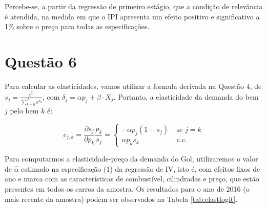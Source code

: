 \documentclass{article}
\begin{document}
Percebe-se, a partir da regressão de primeiro estágio, que a condição de relevância é atendida, na medida em que o IPI apresenta um efeito positivo e significativo a 1\% sobre o preço para todas as especificações.

\section*{Questão 6}
Para calcular as elasticidades, vamos utilizar a formula derivada na Questão 4, de $s_j = \frac{e^{\delta_j}}{\sum_{k = 0}^J e^{\delta_k}}$, com $\delta_j = \alpha p_j + \beta \cdot X_j$. Portanto, a elasticidade da demanda do bem $j$ pelo bem $k$ é:

$$
e_{j,k} = \frac{\partial s_j}{\partial p_k} \frac{p_k}{s_j} = \begin{cases}-\alpha p_{j}\left(1-s_{j}\right) & \text { se } j=k \\ \alpha p_{k} s_{k} & \text { c.c. }\end{cases}
$$

Para computarmos a elasticidade-preço da demanda do Gol, utilizaremos o valor de $\hat{\alpha}$ estimado na especificação (1) da regressão de IV, isto é, com efeitos fixos de ano e marca com as características de combustível, cilindradas e preço, que estão presentes em todos os carros da amostra. Os resultados para o ano de 2016 (o mais recente da amostra) podem ser observados na Tabela \ref{tab:elastlogit}.
\end{document}
